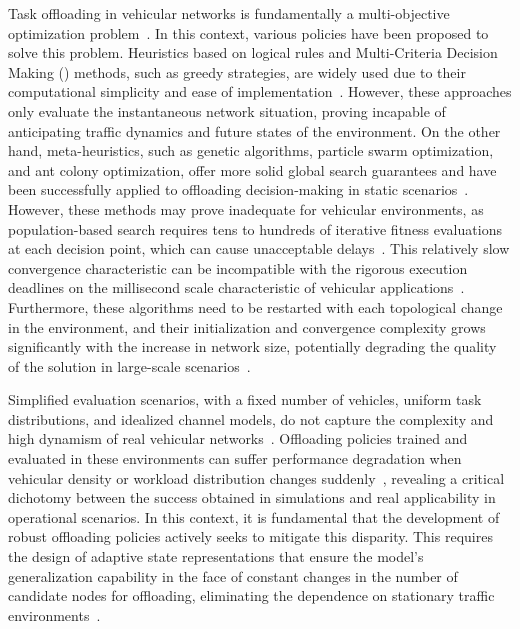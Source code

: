 Task offloading in vehicular networks is fundamentally a multi-objective optimization problem~\cite{wang2020survey,chen2025}. In this context, various policies have been proposed to solve this problem. Heuristics based on logical rules and Multi-Criteria Decision Making () methods, such as greedy strategies, are widely used due to their computational simplicity and ease of implementation~\cite{ahmed2022survey}. However, these approaches only evaluate the instantaneous network situation, proving incapable of anticipating traffic dynamics and future states of the environment. On the other hand, meta-heuristics, such as genetic algorithms, particle swarm optimization, and ant colony optimization, offer more solid global search guarantees and have been successfully applied to offloading decision-making in static scenarios~\cite{li2020genetic,you2021efficient,kishor2022task}. However, these methods may prove inadequate for vehicular environments, as population-based search requires tens to hundreds of iterative fitness evaluations at each decision point, which can cause unacceptable delays~\cite{wu2024,cao2024survey}. This relatively slow convergence characteristic can be incompatible with the rigorous execution deadlines on the millisecond scale characteristic of vehicular applications~\cite{miriyala2026dl_offload_review,uddin2025}. Furthermore, these algorithms need to be restarted with each topological change in the environment, and their initialization and convergence complexity grows significantly with the increase in network size, potentially degrading the quality of the solution in large-scale scenarios~\cite{wang2020survey,long2025}.

Simplified evaluation scenarios, with a fixed number of vehicles, uniform task distributions, and idealized channel models, do not capture the complexity and high dynamism of real vehicular networks~\cite{miriyala2026dl_offload_review}. Offloading policies trained and evaluated in these environments can suffer performance degradation when vehicular density or workload distribution changes suddenly~\cite{miriyala2026dl_offload_review}, revealing a critical dichotomy between the success obtained in simulations and real applicability in operational scenarios. In this context, it is fundamental that the development of robust offloading policies actively seeks to mitigate this disparity. This requires the design of adaptive state representations that ensure the model's generalization capability in the face of constant changes in the number of candidate nodes for offloading, eliminating the dependence on stationary traffic environments~\cite{shao2025,uddin2025}.

